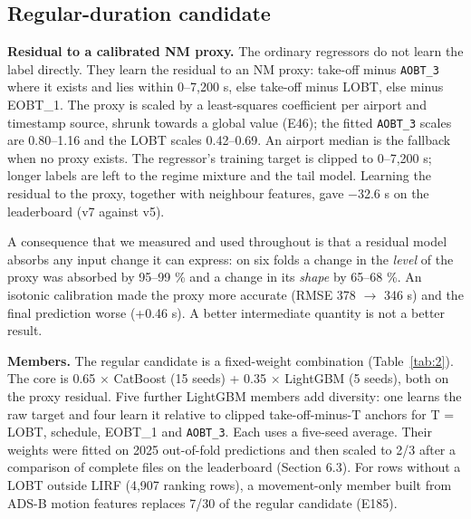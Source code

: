\documentclass[11pt,a4paper]{article}
\begin{document}
\subsection{Regular-duration candidate}\label{regular-duration-candidate}

\textbf{Residual to a calibrated NM proxy.} The ordinary regressors do not learn the label directly. They learn the residual to an NM proxy: take-off minus \texttt{AOBT\_\allowbreak{}3} where it exists and lies within 0--7,200 s, else take-off minus LOBT, else minus EOBT\_1. The proxy is scaled by a least-squares coefficient per airport and timestamp source, shrunk towards a global value (E46); the fitted \texttt{AOBT\_\allowbreak{}3} scales are 0.80--1.16 and the LOBT scales 0.42--0.69. An airport median is the fallback when no proxy exists. The regressor's training target is clipped to 0--7,200 s; longer labels are left to the regime mixture and the tail model. Learning the residual to the proxy, together with neighbour features, gave $-$32.6 s on the leaderboard (v7 against v5).

A consequence that we measured and used throughout is that a residual model absorbs any input change it can express: on six folds a change in the \emph{level} of the proxy was absorbed by 95--99 \% and a change in its \emph{shape} by 65--68 \%. An isotonic calibration made the proxy more accurate (RMSE 378 $\rightarrow$ 346 s) and the final prediction worse (+0.46 s). A better intermediate quantity is not a better result.

\textbf{Members.} The regular candidate is a fixed-weight combination (Table~\ref{tab:2}). The core is 0.65 $\times$ CatBoost \autocite{prokhorenkova2018catboost} (15 seeds) + 0.35 $\times$ LightGBM (5 seeds), both on the proxy residual. Five further LightGBM members add diversity: one learns the raw target and four learn it relative to clipped take-off-minus-T anchors for T = LOBT, schedule, EOBT\_1 and \texttt{AOBT\_\allowbreak{}3}. Each uses a five-seed average. Their weights were fitted on 2025 out-of-fold predictions and then scaled to 2/3 after a comparison of complete files on the leaderboard (Section 6.3). For rows without a LOBT outside LIRF (4,907 ranking rows), a movement-only member built from ADS-B motion features replaces 7/30 of the regular candidate (E185).
\end{document}
